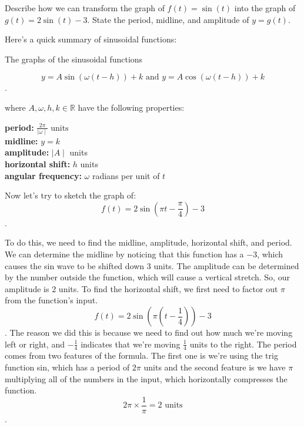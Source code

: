 
\begin{exc}
  \label{exc:transform_the_graph_of_f_to_g}

  Describe how we can transform the graph of $f(t) = \sin(t)$ into the graph of
  $g(t) = 2\sin(t) - 3$. State the period, midline, and amplitude of $y = g(t)$.
\end{exc}

Here's a quick summary of sinusoidal functions:

\begin{theorem}
  The graphs of the sinusoidal functions

  \[ y = A\sin(\omega(t - h)) + k \textrm{ and } y = A\cos(\omega(t - h)) + k \].

  where $A, \omega, h, k \in \mathbb{R}$ have the following properties:

  \begin{center}
    \textbf{period:} $\frac{2\pi}{\mid \omega \mid} \textrm{ units}$ \\
    \textbf{midline:} $y = k$ \\
    \textbf{amplitude:} $\mid A \mid$ units \\
    \textbf{horizontal shift:} $h$ units \\
    \textbf{angular frequency:} $\omega$ radians per unit of $t$
  \end{center}
\end{theorem}

Now let's try to sketch the graph of:
\[
f(t) = 2\sin \left(\pi t - \frac{\pi}{4}\right) - 3
\].

To do this, we need to find the midline, amplitude, horizontal shift, and
period. We can determine the midline by noticing that this function has a $-3$,
which causes the sin wave to be shifted down $3$ units.
The amplitude can be determined by the number outside the function, which will
cause a vertical stretch. So, our amplitude is $2$ units. To find the horizontal
shift, we first need to factor out $\pi$ from the function's input.
\[
f(t) = 2\sin \left(\pi \left(t - \frac{1}{4}\right)\right) - 3
\].
The reason we did this is because we need to find out how much we're moving left
or right, and $-\frac{1}{4}$ indicates that we're moving $\frac{1}{4}$ units to
the right.
The period comes from two features of the formula. The first one is we're using
the trig function sin, which has a period of $2\pi$ units and the second feature
is we have $\pi$ multiplying all of the numbers in the input, which horizontally
compresses the function.
\[
2\pi \times \frac{1}{\pi} = 2 \textrm{ units}
\].

